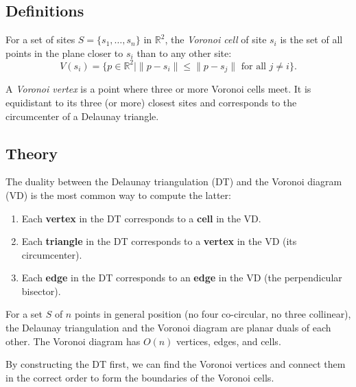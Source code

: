 \subsection{Definitions}

\begin{definition}\label{def:voronoi_cell}
For a set of sites $S = \{s_1, \ldots, s_n\}$ in $\mathbb{R}^2$, the \emph{Voronoi cell} of site $s_i$ is the set of all points in the plane closer to $s_i$ than to any other site:
\[
V(s_i) = \{ p \in \mathbb{R}^2 \mid \|p - s_i\| \le \|p - s_j\| \text{ for all } j \ne i \}.
\]
\end{definition}

\begin{definition}\label{def:voronoi_vertex}
A \emph{Voronoi vertex} is a point where three or more Voronoi cells meet. It is equidistant to its three (or more) closest sites and corresponds to the circumcenter of a Delaunay triangle.
\end{definition}

\subsection{Theory}

The duality between the Delaunay triangulation (DT) and the Voronoi diagram (VD) is the most common way to compute the latter:
\begin{enumerate}
\item Each \textbf{vertex} in the DT corresponds to a \textbf{cell} in the VD.
\item Each \textbf{triangle} in the DT corresponds to a \textbf{vertex} in the VD (its circumcenter).
\item Each \textbf{edge} in the DT corresponds to an \textbf{edge} in the VD (the perpendicular bisector).
\end{enumerate}

\begin{theorem}\label{thm:dt_vd_duality}
For a set $S$ of $n$ points in general position (no four co-circular, no three collinear), the Delaunay triangulation and the Voronoi diagram are planar duals of each other. The Voronoi diagram has $O(n)$ vertices, edges, and cells.
\end{theorem}

By constructing the DT first, we can find the Voronoi vertices and connect them in the correct order to form the boundaries of the Voronoi cells.

